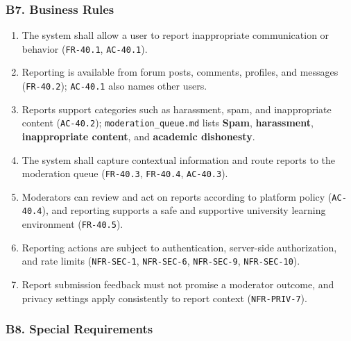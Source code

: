 \documentclass[12pt]{article}
\begin{document}
\subsubsection*{B7. Business Rules}
\par\medskip

\begin{enumerate}
\item The system shall allow a user to report inappropriate communication or behavior (\texttt{FR-40.1}, \texttt{AC-40.1}).
\item Reporting is available from forum posts, comments, profiles, and messages (\texttt{FR-40.2}); \texttt{AC-40.1} also names other users.
\item Reports support categories such as harassment, spam, and inappropriate content (\texttt{AC-40.2}); \texttt{moderation\_queue.md} lists \textbf{Spam}, \textbf{harassment}, \textbf{inappropriate content}, and \textbf{academic dishonesty}.
\item The system shall capture contextual information and route reports to the moderation queue (\texttt{FR-40.3}, \texttt{FR-40.4}, \texttt{AC-40.3}).
\item Moderators can review and act on reports according to platform policy (\texttt{AC-40.4}), and reporting supports a safe and supportive university learning environment (\texttt{FR-40.5}).
\item Reporting actions are subject to authentication, server-side authorization, and rate limits (\texttt{NFR-SEC-1}, \texttt{NFR-SEC-6}, \texttt{NFR-SEC-9}, \texttt{NFR-SEC-10}).
\item Report submission feedback must not promise a moderator outcome, and privacy settings apply consistently to report context (\texttt{NFR-PRIV-7}).
\end{enumerate}
\par\medskip

\hypertarget{sec:b8-special-requirements}{}
\subsubsection*{B8. Special Requirements}
\par\medskip
\end{document}
